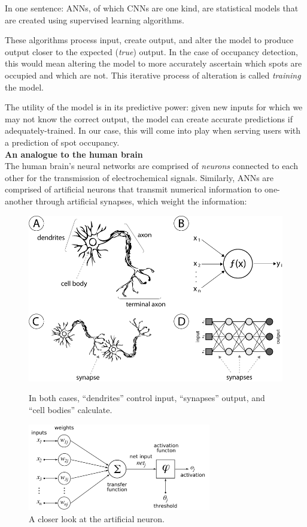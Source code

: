 \documentclass[a4paper, 11pt]{article} %
\begin{document}
    In one sentence: ANNs, of which CNNs are one kind, are statistical models that are created using 
    supervised learning algorithms.
    
    These algorithms process input, create output, and alter the model to produce output closer to the 
    expected (\textit{true}) output. In the case of occupancy detection, this would mean altering the 
    model to more accurately ascertain which spots are occupied and which are not. This iterative 
    process of alteration is called \textit{training} the model.
    
    The utility of the model is in its predictive power: given new inputs for which we may not know the 
    correct output, the model can create accurate predictions if adequately-trained. In our case, this will 
    come into play when serving users with a prediction of spot occupancy. \\
    \textbf{An analogue to the human brain~\cite{brain-analogy}} \\
    \hspace*{6mm}
    The human brain's neural networks are comprised of \textit{neurons} connected to each other for 
    the transmission of electrochemical signals. Similarly, ANNs are comprised of artificial neurons that 
    transmit numerical information to one-another through artificial synapses, which weight the 
    information:
    \vskip 5mm
    \begin{figure}[h]
        \centering
        \includegraphics[width=12cm]{figures/analogy.png}
        \caption{In both cases, ``dendrites'' control input, ``synapses'' output, and ``cell bodies'' 
        calculate.}
        \vspace{5mm}
        \includegraphics[width=8cm]{figures/neuron.png}
        \caption{A closer look at the artificial neuron.}
    \end{figure}
\end{document}
